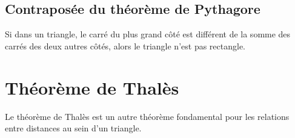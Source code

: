 \subsection{Contraposée du théorème de Pythagore}

\begin{propriete}
    Si dans un triangle, le carré du plus grand côté est différent de la somme des carrés des deux autres côtés, alors le triangle n'est pas rectangle.
\end{propriete}



\section{Théorème de Thalès}

Le théorème de Thalès est un autre théorème fondamental pour les relations entre distances au sein d'un triangle.